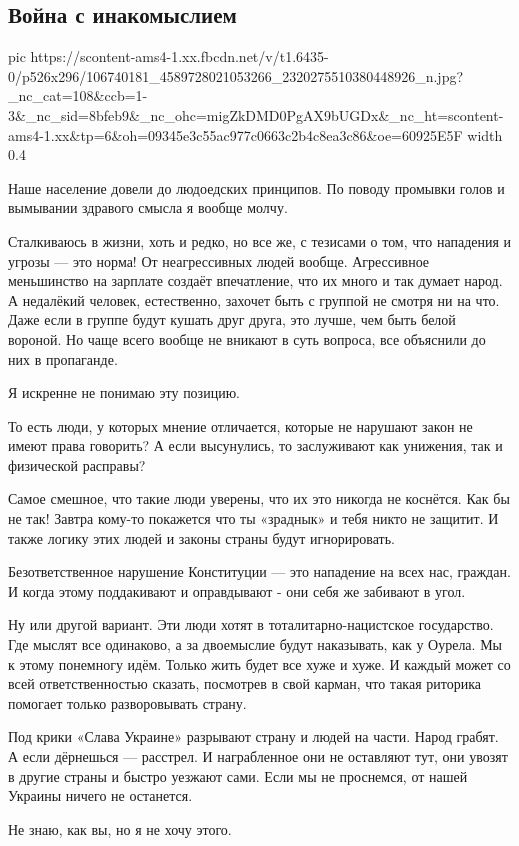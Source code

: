  
 
 
 
 

\subsection{Война с инакомыслием}
\label{sec:01_07_2020.fb.zharkih_ekaterina.1.inakomyslie}


\ifcmt
  pic https://scontent-ams4-1.xx.fbcdn.net/v/t1.6435-0/p526x296/106740181_4589728021053266_2320275510380448926_n.jpg?_nc_cat=108&ccb=1-3&_nc_sid=8bfeb9&_nc_ohc=migZkDMD0PgAX9bUGDx&_nc_ht=scontent-ams4-1.xx&tp=6&oh=09345e3c55ac977c0663c2b4c8ea3c86&oe=60925E5F
  width 0.4
\fi


Наше население довели до людоедских принципов. По поводу промывки голов и вымывании здравого смысла я вообще молчу. 

Сталкиваюсь в жизни, хоть и редко, но все же,  с тезисами о том, что нападения
и угрозы — это норма! От неагрессивных людей вообще. Агрессивное меньшинство на
зарплате создаёт впечатление, что их много и так думает народ. А недалёкий
человек, естественно, захочет быть с группой не смотря ни на что. Даже если в
группе будут кушать друг друга, это лучше, чем быть белой вороной. Но чаще
всего вообще не вникают в суть вопроса, все объяснили до них в пропаганде. 

Я искренне не понимаю эту позицию. 

То есть люди, у которых мнение отличается, которые не нарушают закон не имеют
права говорить? А если высунулись, то заслуживают как унижения, так и
физической расправы? 

Самое смешное, что такие люди уверены, что их это никогда не коснётся. Как бы
не так! Завтра кому-то покажется что ты «зраднык» и тебя никто не защитит. И
также логику этих людей и законы страны будут игнорировать. 

Безответственное нарушение Конституции — это нападение на всех нас, граждан. И
когда этому поддакивают и оправдывают -  они себя же забивают в угол. 

Ну или другой вариант. Эти люди хотят в тоталитарно-нацистское государство. Где
мыслят все одинаково, а за двоемыслие  будут наказывать, как у Оурела. Мы к
этому понемногу идём. Только жить будет все хуже и хуже. И каждый может со всей
ответственностью сказать, посмотрев в свой карман, что такая риторика помогает
только разворовывать страну. 

Под крики «Слава Украине» разрывают страну и людей на части. Народ грабят. А
если дёрнешься — расстрел. И награбленное они не оставляют тут, они увозят в
другие страны и быстро уезжают сами. Если мы не проснемся, от нашей Украины
ничего не останется. 

Не знаю, как вы, но я не хочу этого.
